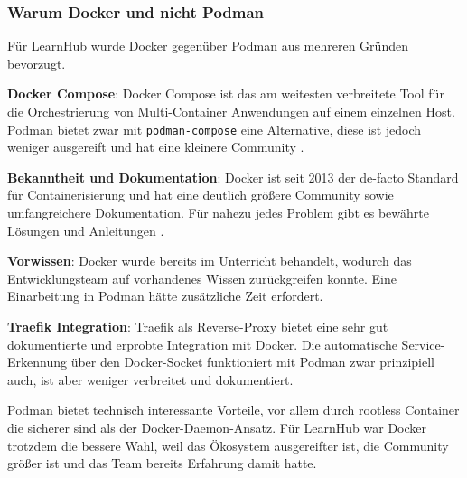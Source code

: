 \subsubsection{Warum Docker und nicht Podman}

Für LearnHub wurde Docker gegenüber Podman aus mehreren 
Gründen bevorzugt.

\textbf{Docker Compose}: Docker Compose ist das am weitesten 
verbreitete Tool für die Orchestrierung von Multi-Container 
Anwendungen auf einem einzelnen Host. Podman bietet zwar mit 
\texttt{podman-compose} eine Alternative, diese ist jedoch 
weniger ausgereift und hat eine kleinere Community 
\cite{podman_docs}.

\textbf{Bekanntheit und Dokumentation}: Docker ist seit 2013 
der de-facto Standard für Containerisierung und hat eine 
deutlich größere Community sowie umfangreichere Dokumentation. 
Für nahezu jedes Problem gibt es bewährte Lösungen und 
Anleitungen \cite{ionos_docker}.

\textbf{Vorwissen}: Docker wurde bereits im Unterricht 
behandelt, wodurch das Entwicklungsteam auf vorhandenes 
Wissen zurückgreifen konnte. Eine Einarbeitung in Podman 
hätte zusätzliche Zeit erfordert.

\textbf{Traefik Integration}: Traefik als Reverse-Proxy 
bietet eine sehr gut dokumentierte und erprobte Integration 
mit Docker. Die automatische Service-Erkennung über den 
Docker-Socket funktioniert mit Podman zwar prinzipiell auch, 
ist aber weniger verbreitet und dokumentiert.

Podman bietet technisch interessante Vorteile, vor allem 
durch rootless Container die sicherer sind als der 
Docker-Daemon-Ansatz. Für LearnHub war Docker trotzdem die 
bessere Wahl, weil das Ökosystem ausgereifter ist, die 
Community größer ist und das Team bereits Erfahrung damit 
hatte.